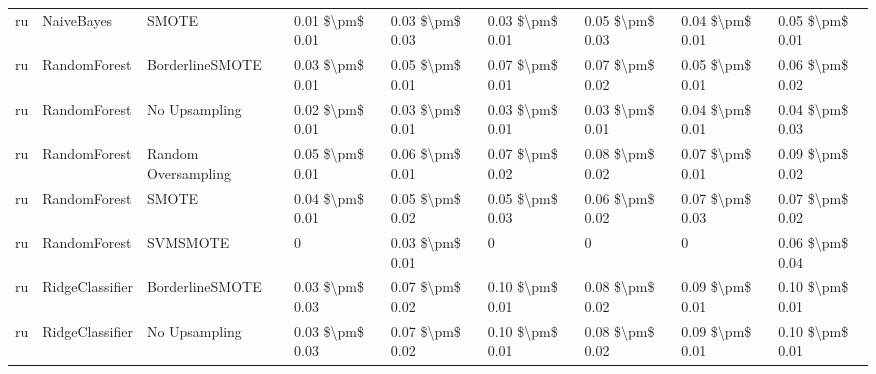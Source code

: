 \begin{tabular}{lllllllll}
      ru &                      NaiveBayes &                         SMOTE & 0.01 \$\textbackslash pm\$ 0.01 &           0.03 \$\textbackslash pm\$ 0.03 &       0.03 \$\textbackslash pm\$ 0.01 &        0.05 \$\textbackslash pm\$ 0.03 &                         0.04 \$\textbackslash pm\$ 0.01 &     0.05 \$\textbackslash pm\$ 0.01 \\
      ru &                    RandomForest &               BorderlineSMOTE & 0.03 \$\textbackslash pm\$ 0.01 &           0.05 \$\textbackslash pm\$ 0.01 &       0.07 \$\textbackslash pm\$ 0.01 &        0.07 \$\textbackslash pm\$ 0.02 &                         0.05 \$\textbackslash pm\$ 0.01 &     0.06 \$\textbackslash pm\$ 0.02 \\
      ru &                    RandomForest &                 No Upsampling & 0.02 \$\textbackslash pm\$ 0.01 &           0.03 \$\textbackslash pm\$ 0.01 &       0.03 \$\textbackslash pm\$ 0.01 &        0.03 \$\textbackslash pm\$ 0.01 &                         0.04 \$\textbackslash pm\$ 0.01 &     0.04 \$\textbackslash pm\$ 0.03 \\
      ru &                    RandomForest &           Random Oversampling & 0.05 \$\textbackslash pm\$ 0.01 &           0.06 \$\textbackslash pm\$ 0.01 &       0.07 \$\textbackslash pm\$ 0.02 &        0.08 \$\textbackslash pm\$ 0.02 &                         0.07 \$\textbackslash pm\$ 0.01 &     0.09 \$\textbackslash pm\$ 0.02 \\
      ru &                    RandomForest &                         SMOTE & 0.04 \$\textbackslash pm\$ 0.01 &           0.05 \$\textbackslash pm\$ 0.02 &       0.05 \$\textbackslash pm\$ 0.03 &        0.06 \$\textbackslash pm\$ 0.02 &                         0.07 \$\textbackslash pm\$ 0.03 &     0.07 \$\textbackslash pm\$ 0.02 \\
      ru &                    RandomForest &                      SVMSMOTE &               0 &           0.03 \$\textbackslash pm\$ 0.01 &                     0 &                      0 &                                       0 &     0.06 \$\textbackslash pm\$ 0.04 \\
      ru &                 RidgeClassifier &               BorderlineSMOTE & 0.03 \$\textbackslash pm\$ 0.03 &           0.07 \$\textbackslash pm\$ 0.02 &       0.10 \$\textbackslash pm\$ 0.01 &        0.08 \$\textbackslash pm\$ 0.02 &                         0.09 \$\textbackslash pm\$ 0.01 &     0.10 \$\textbackslash pm\$ 0.01 \\
      ru &                 RidgeClassifier &                 No Upsampling & 0.03 \$\textbackslash pm\$ 0.03 &           0.07 \$\textbackslash pm\$ 0.02 &       0.10 \$\textbackslash pm\$ 0.01 &        0.08 \$\textbackslash pm\$ 0.02 &                         0.09 \$\textbackslash pm\$ 0.01 &     0.10 \$\textbackslash pm\$ 0.01 \\

\end{tabular}
